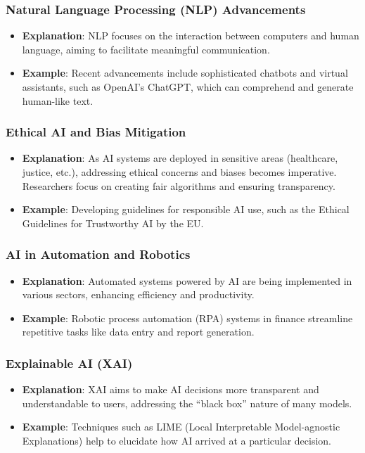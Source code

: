 \documentclass[aspectratio=169]{beamer}
\begin{document}
\begin{frame}[fragile]
    \frametitle{Natural Language Processing (NLP) Advancements}
    \begin{itemize}
        \item \textbf{Explanation}: NLP focuses on the interaction between computers and human language, aiming to facilitate meaningful communication.
        \item \textbf{Example}: Recent advancements include sophisticated chatbots and virtual assistants, such as OpenAI's ChatGPT, which can comprehend and generate human-like text.
    \end{itemize}
\end{frame}

\begin{frame}[fragile]
    \frametitle{Ethical AI and Bias Mitigation}
    \begin{itemize}
        \item \textbf{Explanation}: As AI systems are deployed in sensitive areas (healthcare, justice, etc.), addressing ethical concerns and biases becomes imperative. Researchers focus on creating fair algorithms and ensuring transparency.
        \item \textbf{Example}: Developing guidelines for responsible AI use, such as the Ethical Guidelines for Trustworthy AI by the EU.
    \end{itemize}
\end{frame}

\begin{frame}[fragile]
    \frametitle{AI in Automation and Robotics}
    \begin{itemize}
        \item \textbf{Explanation}: Automated systems powered by AI are being implemented in various sectors, enhancing efficiency and productivity.
        \item \textbf{Example}: Robotic process automation (RPA) systems in finance streamline repetitive tasks like data entry and report generation.
    \end{itemize}
\end{frame}

\begin{frame}[fragile]
    \frametitle{Explainable AI (XAI)}
    \begin{itemize}
        \item \textbf{Explanation}: XAI aims to make AI decisions more transparent and understandable to users, addressing the “black box” nature of many models.
        \item \textbf{Example}: Techniques such as LIME (Local Interpretable Model-agnostic Explanations) help to elucidate how AI arrived at a particular decision.
    \end{itemize}
\end{frame}
\end{document}
